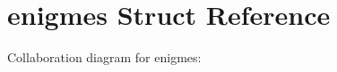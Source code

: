 \hypertarget{structenigmes}{}\section{enigmes Struct Reference}
\label{structenigmes}


Collaboration diagram for enigmes\+:
